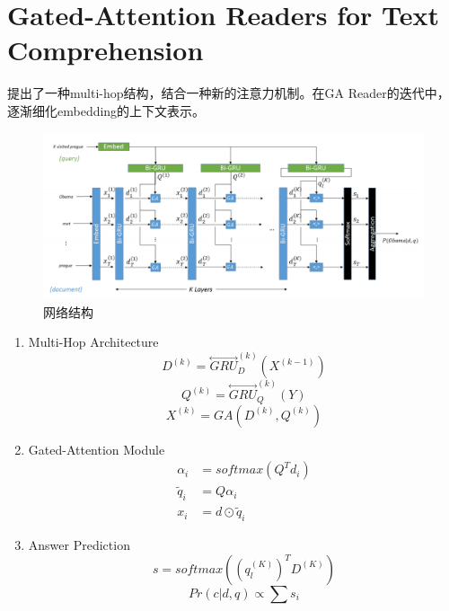 \documentclass[a4paper,UTF8]{article}
\numberwithin{equation}{section}
\begin{document}
\section{Gated-Attention Readers for Text Comprehension}
提出了一种multi-hop结构，结合一种新的注意力机制。在GA Reader的迭代中，逐渐细化embedding的上下文表示。
\begin{figure}[H]
	\centering
	\includegraphics[width=\textwidth]{7-1.png}
	\caption{网络结构}
\end{figure}
\begin{enumerate}
	\item Multi-Hop Architecture\\$$D^{(k)}=\overset{\leftrightarrow }{GRU}_D^{(k)}(X^{(k-1)})$$
	$$Q^{(k)}=\overset{\leftrightarrow}{GRU}_Q^{(k)}(Y)$$
	$$X^{(k)}=GA(D^{(k)},Q^{(k)})$$
	\item Gated-Attention Module\\
	\begin{align*}
		\alpha_i&=softmax(Q^Td_i)\\
		\tilde{q}_i&=Q\alpha_i\\
		x_i&=d\odot \tilde{q}_i
	\end{align*}
	\item Answer Prediction\\$$s=softmax((q_l^{(K)})^TD^{(K)})$$
	$$Pr(c|d,q) \propto \sum s_i$$
\end{enumerate}
\newpage
\end{document}
